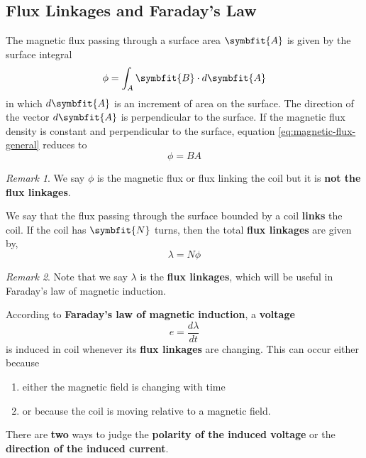\documentclass[math,code]{amznotes}
\theoremstyle{remark}
\newtheorem*{remark}{Remark}
\begin{document}
\subsection{Flux Linkages and Faraday's Law}
The magnetic flux passing through a surface area $\symbfit{A}$ is given by the surface integral
\begin{equation} \label{eq:magnetic-flux-general}
    \phi = \int_A\symbfit{B}\cdot d\symbfit{A}
\end{equation}
in which $d\symbfit{A}$ is an increment of area on the surface. The direction of the vector $d\symbfit{A}$ is perpendicular to the surface. If the magnetic flux density is constant and perpendicular to the surface, equation \eqref{eq:magnetic-flux-general} reduces to
\begin{equation}
    \phi = BA
\end{equation}
\begin{notebox}
    \begin{remark}
        We say $\phi$ is the magnetic flux or flux linking the coil but it is \textbf{not the flux linkages}.
    \end{remark}
\end{notebox}
We say that the flux passing through the surface bounded by a coil \textbf{links} the coil. If the coil has $\symbfit{N}$ turns, then the total {\color{red} \textbf{flux linkages}} are given by,
\begin{equation}
    \lambda =N\phi
\end{equation}
\begin{notebox}
    \begin{remark}
        Note that we say $\lambda$ is the {\color{red} \textbf{flux linkages}}, which will be useful in Faraday's law of magnetic induction.
    \end{remark}
\end{notebox}
According to {\color{red} \textbf{Faraday's law of magnetic induction}}, a {\color{red} \textbf{voltage}}
\begin{equation}
    e=\frac{d\lambda}{dt}
\end{equation}
is induced in coil whenever its \textbf{flux linkages} are changing. This can occur either because
\begin{enumerate}
    \item either the magnetic field is changing with time
    \item or because the coil is moving relative to a magnetic field.
\end{enumerate}
There are \textbf{two} ways to judge the \textbf{polarity of the induced voltage} or the \textbf{direction of the induced current}.
\end{document}
